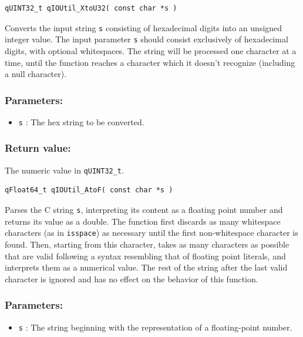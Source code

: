 \documentclass{article}
\begin{document}
\begin{lstlisting}[style=CStyle]
qUINT32_t qIOUtil_XtoU32( const char *s )
\end{lstlisting}

Converts the input string \lstinline{s} consisting of hexadecimal digits into an unsigned 
integer value. The input parameter \lstinline{s} should consist exclusively of hexadecimal 
digits, with optional whitespaces. The string will be processed one character at
a time, until the function reaches a character which it doesn't recognize
(including a null character). 
 
\subsubsection*{Parameters:}
\begin{itemize}
    \item \lstinline{s} : The hex string to be converted.
\end{itemize}

\subsubsection*{Return value:}
The numeric value in \lstinline{qUINT32_t}.


\noindent\hrulefill

\begin{lstlisting}[style=CStyle]
qFloat64_t qIOUtil_AtoF( const char *s )
\end{lstlisting}

Parses the C string \lstinline{s}, interpreting its content as a floating point number and 
returns its value as a double. The function first discards as many whitespace 
characters (as in \lstinline{isspace}) as necessary until the first non-whitespace character is found. Then, starting from this character, takes as many characters as possible that are valid following a syntax resembling that of floating point literals, and 
interprets them as a numerical value. The rest of the string after the last valid 
character is ignored and has no effect on the behavior of this function. 

\subsubsection*{Parameters:}
\begin{itemize}
    \item \lstinline{s} : The string beginning with the representation of a floating-point number.
\end{itemize}
\end{document}
